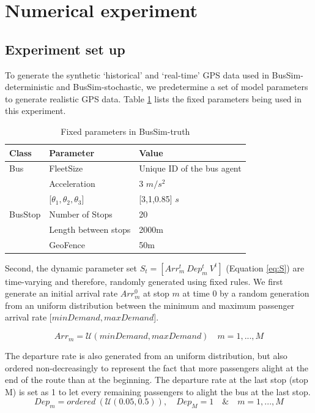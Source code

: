 \section{Numerical experiment}
\label{s:experiments}
\subsection{Experiment set up}

To generate the synthetic `historical' and `real-time' GPS data used in BusSim-deterministic and BusSim-stochastic, we predetermine a set of model parameters to generate realistic GPS data. Table \ref{tab:param} lists the fixed parameters being used in this experiment. 

\begin{table}[htbp]
  \centering
  \caption{Fixed parameters in BusSim-truth}
    \begin{tabular}{rll}
    \multicolumn{1}{l}{\textbf{Class}} & \textbf{Parameter} & \textbf{Value} \\
    \midrule
    \multicolumn{1}{l}{Bus} & FleetSize  & Unique ID of the bus agent \\
          & Acceleration & 3 $m/s^2$ \\
          & [$\theta_1,\theta_2,\theta_3$] & [3,1,0.85] $s$ \\
    \midrule
    \multicolumn{1}{l}{BusStop} & Number of Stops & 20 \\
          & Length between stops & 2000m \\
          & GeoFence & 50m \\
    \bottomrule
    \end{tabular}%
  \label{tab:param}%
\end{table}%

Second, the dynamic parameter set $S_t = [Arr_m^t \ Dep_m^t \ V^t]$ (Equation \ref{eq:S}) are time-varying and therefore, randomly generated using fixed rules. We first generate an initial arrival rate $Arr_m^0$ at stop $m$ at time 0 by a random generation from an uniform distribution between the minimum and maximum passenger arrival rate [$minDemand, maxDemand$]. 
  
  \begin{equation}
   Arr_m = \mathcal{U} (minDemand, maxDemand) \quad m = 1,...,M
   \label{eq:arrival_rate}
\end{equation}

The departure rate is also generated from an uniform distribution, but also ordered non-decreasingly to represent the fact that more passengers alight at the end of the route than at the beginning. The departure rate at the last stop (stop M) is set as 1 to let every remaining passengers to alight the bus at the last stop. 
\begin{equation}
   Dep_m =  ordered \ (\mathcal{U} (0.05, 0.5)), \quad Dep_M = 1 \quad \& \quad m = 1,...,M
     \label{eq:departure_rate}
\end{equation}


